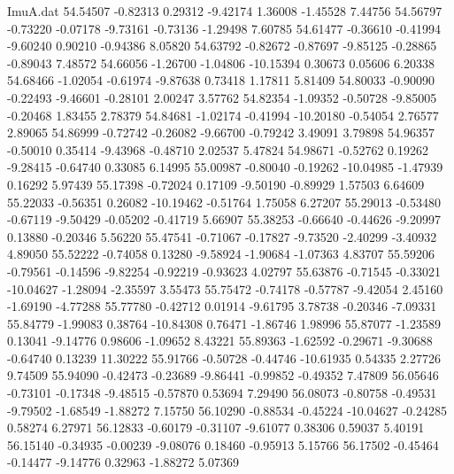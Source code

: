 \begin{filecontents}{ImuA.dat}
  54.54507   -0.82313    0.29312   -9.42174    1.36008   -1.45528    7.44756
  54.56797   -0.73220   -0.07178   -9.73161   -0.73136   -1.29498    7.60785
  54.61477   -0.36610   -0.41994   -9.60240    0.90210   -0.94386    8.05820
  54.63792   -0.82672   -0.87697   -9.85125   -0.28865   -0.89043    7.48572
  54.66056   -1.26700   -1.04806  -10.15394    0.30673    0.05606    6.20338
  54.68466   -1.02054   -0.61974   -9.87638    0.73418    1.17811    5.81409
  54.80033   -0.90090   -0.22493   -9.46601   -0.28101    2.00247    3.57762
  54.82354   -1.09352   -0.50728   -9.85005   -0.20468    1.83455    2.78379
  54.84681   -1.02174   -0.41994  -10.20180   -0.54054    2.76577    2.89065
  54.86999   -0.72742   -0.26082   -9.66700   -0.79242    3.49091    3.79898
  54.96357   -0.50010    0.35414   -9.43968   -0.48710    2.02537    5.47824
  54.98671   -0.52762    0.19262   -9.28415   -0.64740    0.33085    6.14995
  55.00987   -0.80040   -0.19262  -10.04985   -1.47939    0.16292    5.97439
  55.17398   -0.72024    0.17109   -9.50190   -0.89929    1.57503    6.64609
  55.22033   -0.56351    0.26082  -10.19462   -0.51764    1.75058    6.27207
  55.29013   -0.53480   -0.67119   -9.50429   -0.05202   -0.41719    5.66907
  55.38253   -0.66640   -0.44626   -9.20997    0.13880   -0.20346    5.56220
  55.47541   -0.71067   -0.17827   -9.73520   -2.40299   -3.40932    4.89050
  55.52222   -0.74058    0.13280   -9.58924   -1.90684   -1.07363    4.83707
  55.59206   -0.79561   -0.14596   -9.82254   -0.92219   -0.93623    4.02797
  55.63876   -0.71545   -0.33021  -10.04627   -1.28094   -2.35597    3.55473
  55.75472   -0.74178   -0.57787   -9.42054    2.45160   -1.69190   -4.77288
  55.77780   -0.42712    0.01914   -9.61795    3.78738   -0.20346   -7.09331
  55.84779   -1.99083    0.38764  -10.84308    0.76471   -1.86746    1.98996
  55.87077   -1.23589    0.13041   -9.14776    0.98606   -1.09652    8.43221
  55.89363   -1.62592   -0.29671   -9.30688   -0.64740    0.13239   11.30222
  55.91766   -0.50728   -0.44746  -10.61935    0.54335    2.27726    9.74509
  55.94090   -0.42473   -0.23689   -9.86441   -0.99852   -0.49352    7.47809
  56.05646   -0.73101   -0.17348   -9.48515   -0.57870    0.53694    7.29490
  56.08073   -0.80758   -0.49531   -9.79502   -1.68549   -1.88272    7.15750
  56.10290   -0.88534   -0.45224  -10.04627   -0.24285    0.58274    6.27971
  56.12833   -0.60179   -0.31107   -9.61077    0.38306    0.59037    5.40191
  56.15140   -0.34935   -0.00239   -9.08076    0.18460   -0.95913    5.15766
  56.17502   -0.45464   -0.14477   -9.14776    0.32963   -1.88272    5.07369

\end{filecontents}
